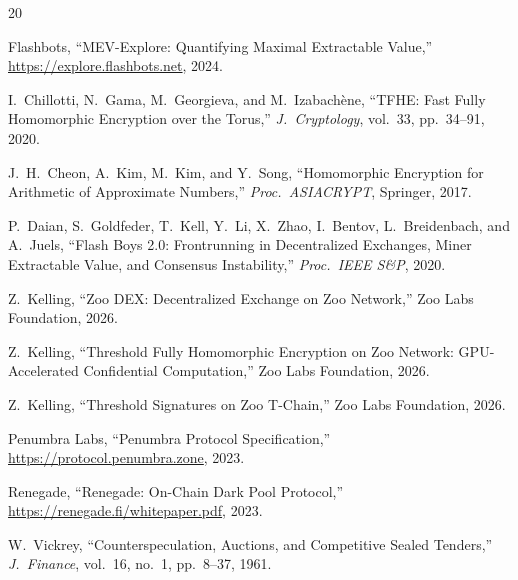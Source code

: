 \documentclass[11pt,letterpaper]{article}
\theoremstyle{definition}
\theoremstyle{remark}
\begin{document}
\begin{thebibliography}{20}

Flashbots,
``MEV-Explore: Quantifying Maximal Extractable Value,''
\url{https://explore.flashbots.net}, 2024.

I.~Chillotti, N.~Gama, M.~Georgieva, and M.~Izabach\`{e}ne,
``TFHE: Fast Fully Homomorphic Encryption over the Torus,''
\textit{J.\ Cryptology}, vol.~33, pp.~34--91, 2020.

J.~H.~Cheon, A.~Kim, M.~Kim, and Y.~Song,
``Homomorphic Encryption for Arithmetic of Approximate Numbers,''
\textit{Proc.\ ASIACRYPT}, Springer, 2017.

P.~Daian, S.~Goldfeder, T.~Kell, Y.~Li, X.~Zhao, I.~Bentov, L.~Breidenbach, and A.~Juels,
``Flash Boys 2.0: Frontrunning in Decentralized Exchanges, Miner Extractable Value, and Consensus Instability,''
\textit{Proc.\ IEEE S\&P}, 2020.

Z.~Kelling,
``Zoo DEX: Decentralized Exchange on Zoo Network,''
Zoo Labs Foundation, 2026.

Z.~Kelling,
``Threshold Fully Homomorphic Encryption on Zoo Network: GPU-Accelerated Confidential Computation,''
Zoo Labs Foundation, 2026.

Z.~Kelling,
``Threshold Signatures on Zoo T-Chain,''
Zoo Labs Foundation, 2026.

Penumbra Labs,
``Penumbra Protocol Specification,''
\url{https://protocol.penumbra.zone}, 2023.

Renegade,
``Renegade: On-Chain Dark Pool Protocol,''
\url{https://renegade.fi/whitepaper.pdf}, 2023.

W.~Vickrey,
``Counterspeculation, Auctions, and Competitive Sealed Tenders,''
\textit{J.\ Finance}, vol.~16, no.~1, pp.~8--37, 1961.

\end{thebibliography}
\end{document}
